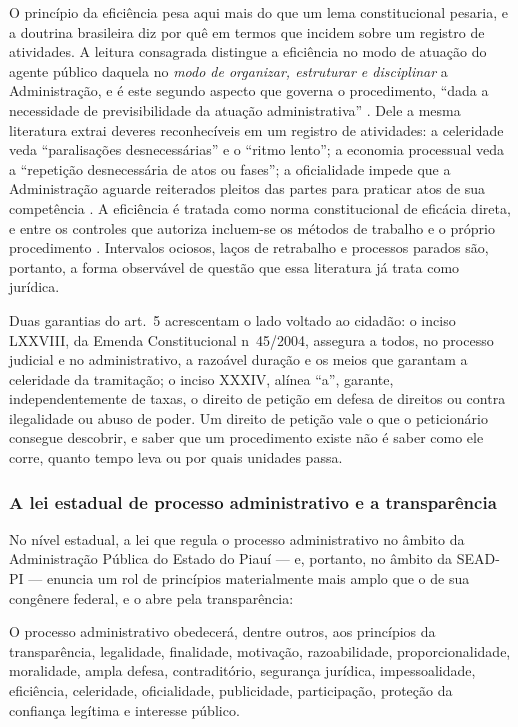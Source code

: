 O princípio da eficiência pesa aqui mais do que um lema constitucional pesaria, e a doutrina
brasileira diz por quê em termos que incidem sobre um registro de atividades. A leitura consagrada distingue a
eficiência no modo de atuação do agente público daquela no \emph{modo de organizar, estruturar e
disciplinar} a Administração, e é este segundo aspecto que governa o procedimento, ``dada a
necessidade de previsibilidade da atuação administrativa''
\cite[p.~180]{brchicoski2004eficiencia}. Dele a mesma literatura extrai deveres reconhecíveis em um
registro de atividades: a celeridade veda ``paralisações desnecessárias'' e o ``ritmo lento''; a economia processual
veda a ``repetição desnecessária de atos ou fases''; a oficialidade impede que a Administração
aguarde reiterados pleitos das partes para praticar atos de sua competência
\cite[p.~184--185]{brchicoski2004eficiencia}. A eficiência é tratada como norma constitucional de
eficácia direta, e entre os controles que autoriza incluem-se os métodos de trabalho e o próprio
procedimento \cite{brgabardo2017eficiencia,brfranca2000eficiencia}. Intervalos ociosos, laços de
retrabalho e processos parados são, portanto, a forma observável de questão que essa literatura já
trata como jurídica.

Duas garantias do art.~5\textordmasculine{} acrescentam o lado voltado ao cidadão: o inciso LXXVIII,
da Emenda Constitucional n\textordmasculine{}~45/2004, assegura a todos, no processo judicial e no
administrativo, a razoável duração e os meios que garantam a celeridade da tramitação; o inciso
XXXIV, alínea ``a'', garante, independentemente de taxas, o direito de petição em defesa de direitos
ou contra ilegalidade ou abuso de poder. Um direito de petição vale o que o peticionário consegue
descobrir, e saber que um procedimento existe não é saber como ele corre, quanto tempo leva ou por
quais unidades passa.

\subsubsection{A lei estadual de processo administrativo e a transparência}

No nível estadual, a lei que regula o processo administrativo no âmbito da Administração Pública
do Estado do Piauí --- e, portanto, no âmbito da SEAD-PI --- enuncia um rol de princípios
materialmente mais amplo que o de sua congênere federal, e o abre pela transparência:

\begin{citacao}
O processo administrativo obedecerá, dentre outros, aos princípios da transparência, legalidade,
finalidade, motivação, razoabilidade, proporcionalidade, moralidade, ampla defesa, contraditório,
segurança jurídica, impessoalidade, eficiência, celeridade, oficialidade, publicidade, participação,
proteção da confiança legítima e interesse público.
\cite[art.~2\textordmasculine{}]{state2016procedurelaw}
\end{citacao}


